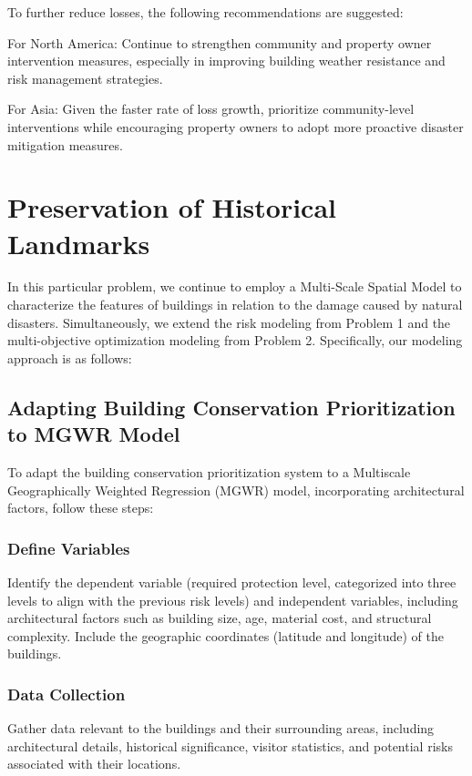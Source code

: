 \documentclass[12pt]{article}
\begin{document}
To further reduce losses, the following recommendations are suggested:

For North America: Continue to strengthen community and property owner intervention measures, especially in improving building weather resistance and risk management strategies.

For Asia: Given the faster rate of loss growth, prioritize community-level interventions while encouraging property owners to adopt more proactive disaster mitigation measures.

\section{Preservation of Historical Landmarks}
In this particular problem, we continue to employ a Multi-Scale Spatial Model to characterize the features of buildings in relation to the damage caused by natural disasters. Simultaneously, we extend the risk modeling from Problem 1 and the multi-objective optimization modeling from Problem 2. Specifically, our modeling approach is as follows:

\subsection{Adapting Building Conservation Prioritization to MGWR Model}

To adapt the building conservation prioritization system to a Multiscale Geographically Weighted Regression (MGWR) model, incorporating architectural factors, follow these steps:

\subsubsection{Define Variables}
Identify the dependent variable (required protection level, categorized into three levels to align with the previous risk levels) and independent variables, including architectural factors such as building size, age, material cost, and structural complexity. Include the geographic coordinates (latitude and longitude) of the buildings.

\subsubsection{Data Collection}
Gather data relevant to the buildings and their surrounding areas, including architectural details, historical significance, visitor statistics, and potential risks associated with their locations.
\end{document}
